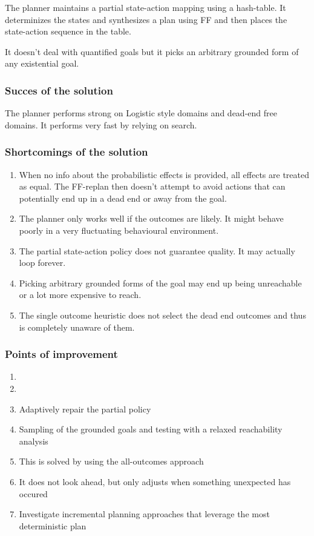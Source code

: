 \documentclass[runningheads,a4paper]{llncs}
\begin{document}
The planner maintains a partial state-action mapping using a hash-table. It determinizes the states and synthesizes a plan using FF and then places the state-action sequence in the table.

It doesn't deal with quantified goals but it picks an arbitrary grounded form of any existential goal.

\subsubsection{Succes of the solution}
The planner performs strong on Logistic style domains and dead-end free domains. It performs very fast by relying on search.

\subsubsection{Shortcomings of the solution}
\begin{enumerate}
	\item When no info about the probabilistic effects is provided, all effects are treated as equal. The FF-replan then doesn't attempt to avoid actions that can potentially end up in a dead end or away from the goal.
	\item  The planner only works well if the outcomes are likely. It might behave poorly in a very fluctuating behavioural environment.
	\item The partial state-action policy does not guarantee quality. It may actually loop forever.
	\item Picking arbitrary grounded forms of the goal may end up being unreachable or a lot more expensive to reach.
	\item The single outcome heuristic does not select the dead end outcomes and thus is completely unaware of them.
\end{enumerate}

\subsubsection{Points of improvement}
\begin{enumerate}
	\item
	\item
	\item Adaptively repair the partial policy
	\item Sampling of the grounded goals and testing with a relaxed reachability analysis
	\item This is solved by using the all-outcomes approach
	\item It does not look ahead, but only adjusts when something unexpected has occured

	\item Investigate incremental planning approaches that leverage the most deterministic plan
\end{enumerate}
\end{document}
